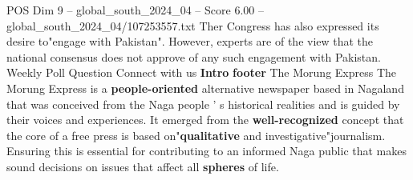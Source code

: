 \begin{textsample}{POS Dim 9 – global\_south\_2024\_04 – Score 6.00 – global\_south\_2024\_04/107253557.txt}
Ther Congress has also expressed its desire to"engage with Pakistan".
However, experts are of the view that the national consensus does not approve of any such engagement with Pakistan.
Weekly Poll Question Connect with us \textbf{Intro} \textbf{footer} The Morung Express The Morung Express is a \textbf{people-oriented} alternative newspaper based in Nagaland that was conceived from the Naga people ' s historical realities and is guided by their voices and experiences.
It emerged from the \textbf{well-recognized} concept that the core of a free press is based on"\textbf{qualitative} and investigative"journalism.
Ensuring this is essential for contributing to an informed Naga public that makes sound decisions on issues that affect all \textbf{spheres} of life.

\end{textsample}
